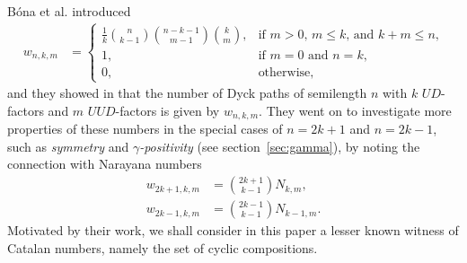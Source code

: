 \documentclass[reqno]{amsart}
\numberwithin{equation}{section}
\theoremstyle{definition}
\theoremstyle{named}
\begin{document}
B\'ona et al. introduced
\begin{align}\label{formula for w}
w_{n,k,m} &= \begin{cases}
\frac{1}{k}\binom{n}{k-1}\binom{n-k-1}{m-1}\binom{k}{m}, & \text{if $m>0$, $m\le k$, and $k+m\le n$,}\\
1, & \text{if $m=0$ and $n=k$,}\\
0, & \text{otherwise,}
\end{cases}
\end{align}
and they showed in \cite[Thm.~1.2]{BDL2022} that the number of Dyck paths of semilength $n$ with $k$ $UD$-factors and $m$ $UUD$-factors is given by $w_{n,k,m}$. They went on to investigate more properties of these numbers in the special cases of $n=2k+1$ and $n=2k-1$, such as {\it symmetry} and {\it $\gamma$-positivity} (see section~\ref{sec:gamma}), by noting the connection with Narayana numbers
\begin{align}\label{id:w-Narayana}
w_{2k+1,k,m} &= \binom{2k+1}{k-1}N_{k,m},\\
w_{2k-1,k,m} &= \binom{2k-1}{k-1}N_{k-1,m}.
\label{id:w-Narayana2}
\end{align}
Motivated by their work, we shall consider in this paper a lesser known witness of Catalan numbers, namely the set of cyclic compositions.
 
\end{document}
